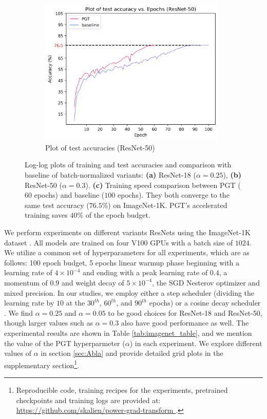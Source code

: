\documentclass[runningheads]{llncs}
\begin{document}
\begin{figure}[!t]
\begin{subfigure}{.33\textwidth}
\centering
\includegraphics[width=0.98\textwidth]{acc_vs_epoch_r50_60epochs}
\caption{Plot of test accuracies (ResNet-50)}
\end{subfigure}
\caption{ Log-log plots of training and test accuracies and comparison with baseline of
batch-normalized variants: \textbf{(a)} ResNet-18 ($\alpha=0.25$), \textbf{(b)}
ResNet-50 ($\alpha=0.3$). \textbf{(c)} Training speed comparison between PGT ($60$
epochs) and baseline ($100$ epochs). They both converge to the same test accuracy
($76.5\%$) on ImageNet-1K. PGT's accelerated training saves $40\%$ of the epoch budget.
}
\label{fig:metrics}
\vspace{-0.5cm}
\end{figure}




We perform experiments on different variants ResNets using the ImageNet-1K dataset
\cite{deng2009imagenet}. All models are trained on four V100 GPUs with a batch size of
$1024$. We utilize a common set of hyperparameters for all experiments, which are as
follows: 100 epoch budget, 5 epochs linear warmup phase beginning with a learning rate
of $4\times 10^{-4}$ and ending with a peak learning rate of $0.4$, a momentum of $0.9$
and weight decay of $5\times 10^{-4}$, the SGD Nesterov optimizer and mixed precision.
In our studies, we employ either a step scheduler (dividing the learning rate by $10$ at
the $30^{th}$, $60^{th}$, and $90^{th}$ epochs) or a cosine decay scheduler
\cite{loshchilov2016sgdr}. We find $\alpha=0.25$ and $\alpha=0.05$ to be good choices
for ResNet-18 and ResNet-50, though larger values such as $\alpha=0.3$ also have good
performance as well. The experimental results are shown in Table
\ref{tab:imagenet_table}, and we mention the value of the PGT hyperparmeter ($\alpha$)
in each experiment. We explore different values of $\alpha$ in section \ref{sec:Abla}
and provide detailed grid plots in the supplementary section\footnote{Reproducible code,
training recipes for the experiments, pretrained checkpoints and training logs are
provided at: \url{ https://github.com/skalien/power-grad-transform }.}.
\end{document}
